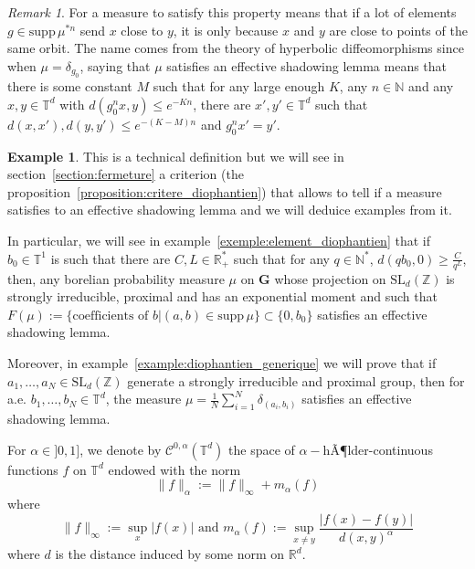 \documentclass[11pt]{amsart}
\theoremstyle{definition}
\newtheorem{example}[theorem]{Example}
\theoremstyle{remark}
\newtheorem{remark}[theorem]{Remark}
\numberwithin{equation}{section}
\begin{document}
\begin{remark}
For a measure to satisfy this property means that if a lot of elements $g\in {\mathrm{supp}\,}\mu^{\ast n}$ send $x$ close to $y$, it is only because $x$ and $y$ are close to points of the same orbit. The name comes from the theory of hyperbolic diffeomorphisms since when $\mu=\delta_{g_0}$, saying that $\mu$ satisfies an effective shadowing lemma means that there is some constant $M$ such that for any large enough $K$, any $n\in {\mathbb N}$ and any $x,y\in {\mathbb T}^d$ with $d(g^n_0 x,y) \leqslant e^{-K n}$, there are $x',y' \in {\mathbb T}^d$ such that $d(x,x'),d(y,y')\leqslant e^{-(K-M)n}$ and $g^n_0 x' = y'$.
\end{remark}

\begin{example}
This is a technical definition but we will see in section~\ref{section:fermeture} a criterion (the proposition~\ref{proposition:critere_diophantien}) that allows to tell if a measure satisfies to an effective shadowing lemma and we will deduice examples from it.

In particular, we will see in example~\ref{exemple:element_diophantien} that if $b_0\in{\mathbb T}^1$ is such that there are $C,L \in {\mathbb R}_+^\ast$ such that for any $q\in {\mathbb N}^\ast$, $d(qb_0,0) \geqslant \frac C {q^L}$, then, any borelian probability measure $\mu$ on ${\mathbf G}$ whose projection on $\mathrm{SL}_d({\mathbb Z})$ is strongly irreducible, proximal and has an exponential moment and such that $F(\mu):=\{\text{coefficients of }b|(a,b)\in {\mathrm{supp}\,}\mu\} \subset \{0,b_0\}$ satisfies an effective shadowing lemma.

Moreover, in example~\ref{example:diophantien_generique} we will prove that if $a_1, \dots , a_N \in \mathrm{SL}_d({\mathbb Z})$ generate a strongly irreducible and proximal group, then for a.e. $b_1, \dots , b_N\in {\mathbb T}^d$, the measure $\mu = \frac 1 N \sum_{i=1}^N \delta_{(a_i,b_i)}$ satisfies an effective shadowing lemma.
\end{example}

For $\alpha\in ]0,1]$, we denote by $\mathcal{C}^{0,\alpha}({\mathbb T}^d)$ the space of $\alpha-$hÃ¶lder-continuous functions $f$ on ${\mathbb T}^d$ endowed with the norm
\[
\|f\|_\alpha := \|f\|_\infty + m_\alpha(f)
\]
where
\[
\|f\|_\infty := \sup_x|f(x)| \text{ and }m_\alpha(f) := \sup_{x\not=y} \frac{ |f(x)-f(y)|}{d(x,y)^\alpha}
\]
where $d$ is the distance induced by some norm on ${\mathbb R}^d$.
\end{document}
